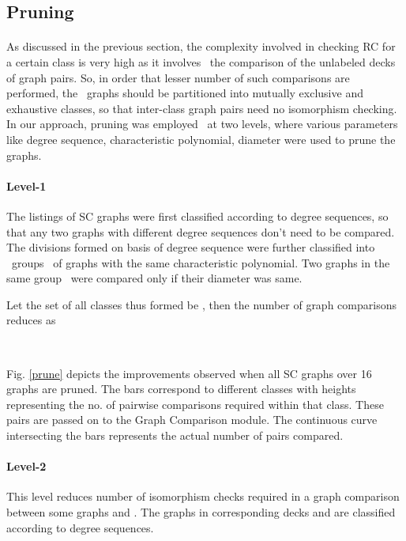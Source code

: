 \documentclass[12pt,conference]{IEEEtran}
\begin{document}
\subsection{\label{2.3} Pruning }
\paragraph*{} As discussed in the previous section, the complexity involved in checking RC for a certain class is very high as it involves  the comparison of the unlabeled decks of graph pairs. So, in order that lesser number of such comparisons are performed, the  graphs should be partitioned into mutually exclusive and exhaustive classes, so that inter-class graph pairs need no isomorphism checking. In our approach, pruning was employed  at two levels, where various parameters like degree sequence, characteristic polynomial, diameter were used to prune the graphs.  \\
\paragraph*{\label{2.3a} Level-1 } The listings of SC graphs were first classified according to degree sequences, so that any two graphs with different degree sequences don’t need to be compared. The divisions formed on basis of degree sequence were further classified into  groups  of graphs with the same characteristic polynomial. Two graphs in the same group   were compared only if their diameter was same. 

 Let the set of all classes thus formed be , then the number of graph comparisons reduces as

\ \ \ \ \ \ \ \ \  

Fig. \ref{prune} depicts the improvements observed when all SC graphs over 16 graphs are pruned. The bars correspond to different classes with heights representing the no. of pairwise comparisons required within that class.
These pairs are passed on to the Graph Comparison module. The continuous curve intersecting the bars represents the actual number of pairs compared. \\ 

\paragraph*{\label{2.3b} Level-2} This level reduces number of isomorphism checks required in a graph comparison between some graphs  and . The graphs in corresponding decks  and  are classified according to degree sequences. 
\end{document}
